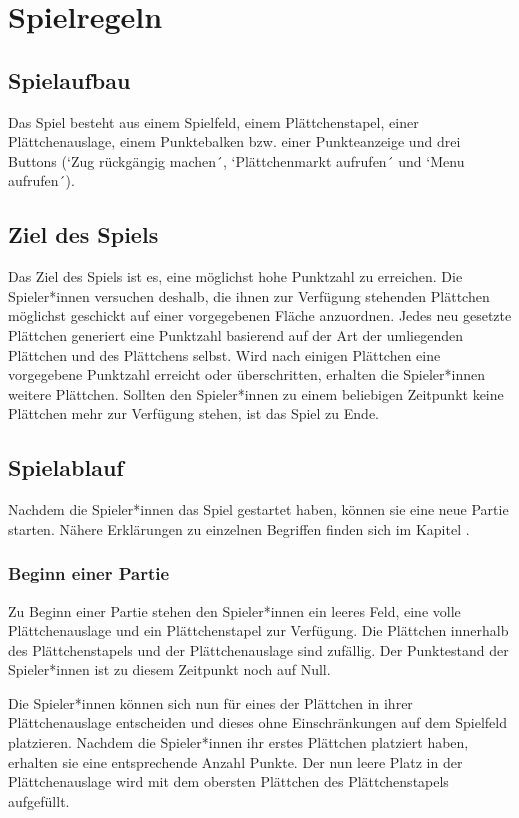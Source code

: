 \documentclass[../main.tex]{subfiles}
\begin{document}
	\section{Spielregeln}
	\label{section:Spielregeln}
	\subsection{Spielaufbau}
	\par Das Spiel besteht aus einem Spielfeld, einem Plättchenstapel, einer Plättchenauslage, einem Punktebalken bzw. einer Punkteanzeige und drei Buttons (`Zug rückgängig machen´, `Plättchenmarkt aufrufen´ und `Menu aufrufen´). 

	\subsection{Ziel des Spiels}
	\par Das Ziel des Spiels ist es, eine möglichst hohe Punktzahl zu erreichen. Die Spieler*innen versuchen deshalb, die ihnen zur Verfügung stehenden Plättchen möglichst geschickt auf einer vorgegebenen Fläche anzuordnen. Jedes neu gesetzte Plättchen generiert eine Punktzahl basierend auf der Art der umliegenden Plättchen und des Plättchens selbst. Wird nach einigen Plättchen eine vorgegebene Punktzahl erreicht oder überschritten, erhalten die Spieler*innen weitere Plättchen. Sollten den Spieler*innen zu einem beliebigen Zeitpunkt keine Plättchen mehr zur Verfügung stehen, ist das Spiel zu Ende.
	
	\subsection{Spielablauf}
	\par Nachdem die Spieler*innen das Spiel gestartet haben, können sie eine neue Partie starten. Nähere Erklärungen zu einzelnen Begriffen finden sich im Kapitel .
	\subsubsection{Beginn einer Partie}
	\par Zu Beginn einer Partie stehen den Spieler*innen ein leeres Feld, eine volle Plättchenauslage und ein Plättchenstapel zur Verfügung. Die Plättchen innerhalb des Plättchenstapels und der Plättchenauslage sind zufällig. Der Punktestand der Spieler*innen ist zu diesem Zeitpunkt noch auf Null.
	\par Die Spieler*innen können sich nun für eines der Plättchen in ihrer Plättchenauslage entscheiden und dieses ohne Einschränkungen auf dem Spielfeld platzieren. Nachdem die Spieler*innen ihr erstes Plättchen platziert haben, erhalten sie eine entsprechende Anzahl Punkte. Der nun leere Platz in der Plättchenauslage wird mit dem obersten Plättchen des Plättchenstapels aufgefüllt.
\end{document}

